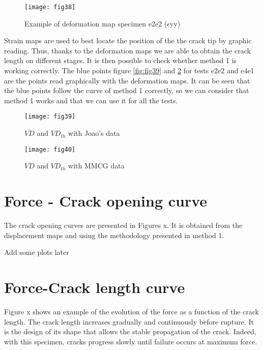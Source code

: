 \begin{figure}[htp]
	\centering
	\texttt{[image: fig38]}
	\caption{Example of deformation map specimen e2e2 ($\epsilon$yy)}
	\label{fig:fig38}
\end{figure}

Strain maps are used to best locate the position of the the crack tip by graphic reading.
Thus, thanks to the deformation maps we are able to obtain the crack length on different stages. It is then possible to check whether method 1 is working correctly.
The blue points figure \ref{fig:fig39} and \ref{fig:fig40} for tests e2e2 and e4e1 are the points read graphically with the deformation maps. It can be seen that the blue points follow the curve of method 1 correctly, so we can consider that method 1 works and that we can use it for all the tests.

\begin{figure}[htp]
	\begin{minipage}[c]{.46\linewidth}
		\centering
		\texttt{[image: fig39]}
		\caption{$\overline{VD}$ and $VD_{th}$ with Joao's data}
		\label{fig:fig39}
	\end{minipage}
	\hfill%
	\begin{minipage}[c]{.46\linewidth}
		\centering
		\texttt{[image: fig40]}
		\caption{$\overline{VD}$ and $VD_{th}$ with MMCG data}
		\label{fig:fig40}
	\end{minipage}
\end{figure}


\section{Force - Crack opening curve}

The crack opening curves are presented in Figures x. It is obtained from the displacement maps and using the methodology presented in method 1.

Add some plots later

\section{Force-Crack length curve}

Figure x shows an example of the evolution of the force as a function of the crack length. The crack length increases gradually and continuously before rupture. It is the design of its shape that allows the stable propagation of the crack. Indeed, with this specimen, cracks progress slowly until failure occurs at maximum force.

